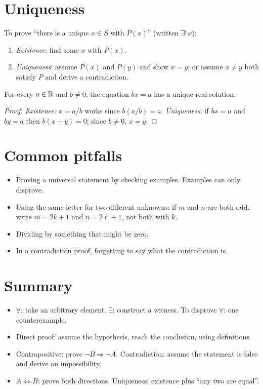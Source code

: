\section{Uniqueness}

To prove ``there is a unique $x \in S$ with $P(x)$'' (written $\exists!\, x$):
\begin{enumerate}
  \item \emph{Existence}: find some $x$ with $P(x)$.
  \item \emph{Uniqueness}: assume $P(x)$ and $P(y)$ and show $x = y$; or assume $x \ne y$
        both satisfy $P$ and derive a contradiction.
\end{enumerate}

\begin{proposition}
For every $a \in \mathbb{R}$ and $b \neq 0$, the equation $bx = a$ has a unique real solution.
\end{proposition}
\begin{proof}
\emph{Existence:} $x = a/b$ works since $b(a/b) = a$.
\emph{Uniqueness:} if $bx = a$ and $by = a$ then $b(x - y) = 0$; since $b \ne 0$, $x = y$.
\end{proof}

\section{Common pitfalls}
\begin{itemize}
  \item Proving a universal statement by checking examples. Examples can only disprove.
  \item Using the same letter for two different unknowns: if $m$ and $n$ are both odd, write
        $m = 2k + 1$ and $n = 2\ell + 1$, not both with $k$.
  \item Dividing by something that might be zero.
  \item In a contradiction proof, forgetting to say what the contradiction is.
\end{itemize}

\section{Summary}
\begin{itemize}
  \item $\forall$: take an arbitrary element. $\exists$: construct a witness. To disprove
        $\forall$: one counterexample.
  \item Direct proof: assume the hypothesis, reach the conclusion, using definitions.
  \item Contrapositive: prove $\neg B \Rightarrow \neg A$. Contradiction: assume the
        statement is false and derive an impossibility.
  \item $A \Leftrightarrow B$: prove both directions. Uniqueness: existence plus ``any two are
        equal''.
\end{itemize}
